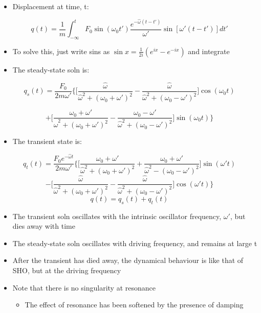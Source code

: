 \documentclass[a4paper,11pt,normalem]{article}
\begin{document}
\begin{itemize}
\item
  Displacement at time, t:
\end{itemize}

\[
    q(t) = \frac{1}{m} \int_{-\infty}^{t} F_0 \sin(\omega_{0}t')\frac{e^{-\hat{\omega}(t - t')}}{\omega'}\sin[\omega'(t - t')]dt'
\]

\begin{itemize}
\item
  To solve this, just write sins as
  \(\sin x = \frac{1}{2i}(e^{ix} - e^{-ix})\) and integrate
\item
  The steady-state soln is:
\end{itemize}

\[
    q_{s}(t) = \frac{F_0}{2m\omega'} \Bigg\{\Big[\frac{\hat{\omega}}{\hat{\omega}^2 + (\omega_{0} + \omega')^2} - \frac{\hat{\omega}}{\hat{\omega}^2 + (\omega_{0} - \omega')^2} \Big]\cos(\omega_{0}t)
\]

\[
    + \Big[\frac{\omega_{0} + \omega'}{\hat{\omega}^2 + (\omega_{0} +   \omega')^2} - \frac{\omega_{0} - \omega'}{\hat{\omega}^2 + (\omega_{0} - \omega')^2} \Big]\sin(\omega_{0}t) \Bigg\}
\]

\begin{itemize}
\item
  The transient state is:
\end{itemize}

\[
    q_{t}(t) = \frac{F_0 e^{-\hat{\omega}t}}{2m\omega'} \Bigg\{ \Big[\frac{\omega_{0} + \omega'}{\hat{\omega}^2 + (\omega_{0} + \omega')^2} + \frac{\omega_{0} + \omega'}{\hat{\omega}^2 - (\omega_{0} - \omega')^2} \Big]\sin(\omega't)
\] \[
    - \Big[\frac{\hat{\omega}}{\hat{\omega}^2 + (\omega_{0} + \omega')^2} - \frac{\hat{\omega}}{\hat{\omega}^2 + (\omega_{0} - \omega')^2} \Big]\cos(\omega't) \Bigg\} \]
\[
    q(t) = q_{s}(t) + q_{t}(t)
\]

\begin{itemize}
\item
  The transient soln oscillates with the intrinsic oscillator frequency,
  \(\omega'\), but dies away with time
\item
  The steady-state soln oscillates with driving frequency, and remains
  at large t
\item
  After the transient has died away, the dynamical behaviour is like
  that of SHO, but at the driving frequency
\item
  Note that there is no singularity at resonance

  \begin{itemize}
  \item
    The effect of resonance has been softened by the presence of damping
  \end{itemize}
\end{itemize}
\end{document}
